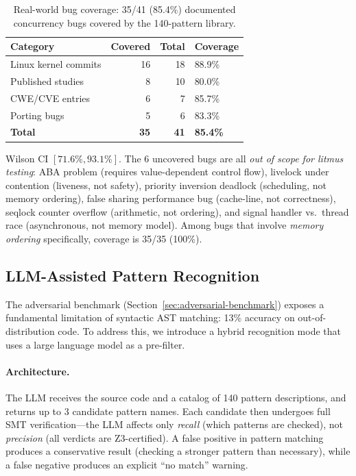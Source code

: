\documentclass[11pt]{article}
\begin{document}
\begin{table}[ht]
\centering
\caption{Real-world bug coverage: 35/41 (85.4\%) documented
concurrency bugs covered by the 140-pattern library.}
\label{tab:bug-coverage}
\small
\begin{tabular}{lrrl}
\toprule
\textbf{Category} & \textbf{Covered} & \textbf{Total} & \textbf{Coverage} \\
\midrule
Linux kernel commits     & 16 & 18 & 88.9\% \\
Published studies        & 8  & 10 & 80.0\% \\
CWE/CVE entries          & 6  & 7  & 85.7\% \\
Porting bugs             & 5  & 6  & 83.3\% \\
\midrule
\textbf{Total}           & \textbf{35} & \textbf{41} & \textbf{85.4\%} \\
\bottomrule
\end{tabular}
\end{table}

\noindent
Wilson CI $[71.6\%, 93.1\%]$.
The 6 uncovered bugs are all \emph{out of scope for litmus testing}:
ABA problem (requires value-dependent control flow),
livelock under contention (liveness, not safety),
priority inversion deadlock (scheduling, not memory ordering),
false sharing performance bug (cache-line, not correctness),
seqlock counter overflow (arithmetic, not ordering),
and signal handler vs.\ thread race (asynchronous, not memory model).
Among bugs that involve \emph{memory ordering} specifically,
coverage is 35/35 (100\%).

\subsection{LLM-Assisted Pattern Recognition}
\label{sec:llm-recognition}

The adversarial benchmark (Section~\ref{sec:adversarial-benchmark})
exposes a fundamental limitation of syntactic AST matching: 13\%
accuracy on out-of-distribution code.  To address this, we introduce
a hybrid recognition mode that uses a large language model as
a pre-filter.

\paragraph{Architecture.}
The LLM receives the source code and a catalog of 140 pattern
descriptions, and returns up to 3 candidate pattern names.
Each candidate then undergoes full SMT verification---the LLM
affects only \emph{recall} (which patterns are checked), not
\emph{precision} (all verdicts are Z3-certified).
A false positive in pattern matching produces a conservative
result (checking a stronger pattern than necessary), while
a false negative produces an explicit ``no match'' warning.
\end{document}
